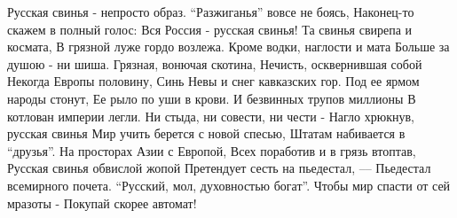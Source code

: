  
 
 
 
 

Русская свинья - непросто образ.
“Разжиганья” вовсе не боясь,
Наконец-то скажем в полный голос:
Вся Россия - русская свинья!
Та свинья свирепа и космата,
В грязной луже гордо возлежа.
Кроме водки, наглости и мата
Больше за душою - ни шиша.
Грязная, вонючая скотина,
Нечисть, осквернившая собой
Некогда Европы половину,
Синь Невы и снег кавказских гор.
Под ее ярмом народы стонут,
Ее рыло по уши в крови.
И безвинных трупов миллионы
В котлован империи легли.
Ни стыда, ни совести, ни чести -
Нагло хрюкнув, русская свинья
Мир учить берется с новой спесью,
Штатам набивается в “друзья”.
На просторах Азии с Европой,
Всех поработив и в грязь втоптав,
Русская свинья обвислой жопой
Претендует сесть на пьедестал, ––
Пьедестал всемирного почета.
“Русский, мол, духовностью богат”.
Чтобы мир спасти от сей мразоты -
Покупай скорее автомат!
